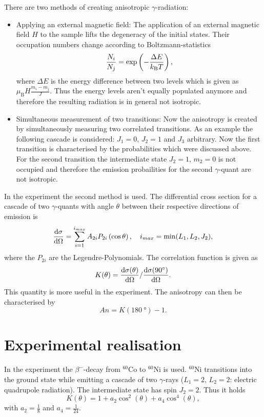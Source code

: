 There are two methods of creating anisotropic $\gamma$-radiation:
\begin{itemize}
 \item Applying an external magnetic field: The application of an external magnetic field $H$ to the sample lifts the degeneracy of the initial states. Their occupation numbers change according to Boltzmann-statistics
	\begin{equation}
	 \frac{N_{i}}{N_{j}} = \exp\left(-\frac{\Delta E}{k_{\textrm{B}} T}\right),
	\end{equation}
	where $\Delta E$ is the energy difference between two levels which is given as $\mu_{\textrm{B}}H\frac{m_{i}-m_{j}}{J}$. Thus the energy levels aren't equally populated anymore and therefore the resulting radiation is in general not isotropic.
 \item Simultaneous measurement of two transitions: Now the anisotropy is created by simultaneously measuring two correlated transitions. As an example the following cascade is considered: $J_{1}=0$, $J_{2}=1$ and $J_{3}$ arbitrary. Now the first transition is characterised by the probabilities which were discussed above. For the second transition the intermediate state $J_{2}=1, \, m_{2}=0$ is not occupied and therefore the emission probailities for the second $\gamma$-quant are not isotropic.  
\end{itemize}

In the experiment the second method is used. The differential cross section for a cascade of two $\gamma$-quants with angle $\theta$ between their respective directions of emission is \cite{BB}
\begin{equation}
 \frac{\text{d}\sigma}{\text{d}\Omega} = \sum_{i=1}^{i_{max}} A_{2i}P_{2i}\left(\cos\theta\right), \quad i_{max}= \textrm{min}(L_{1},L_{2},J_{2}),
\end{equation}
where the $P_{2i}$ are the Legendre-Polynomials. The correlation function is given as
\begin{equation}
 K(\theta) = \frac{\text{d}\sigma(\theta)}{\text{d}\Omega} / \frac{\text{d}\sigma(\SI{90}{\degree})}{\text{d}\Omega}.
\end{equation}
This quantity is more useful in the experiment. The anisotropy can then be characterised by
\begin{equation}
 An = K(\SI{180}{\degree})-1.
\end{equation}

\section{Experimental realisation}

In the experiment the $\beta^{-}$-decay from $^{60}$Co to $^{60}$Ni is used. $^{60}$Ni transitions into the ground state while emitting a cascade of two $\gamma$-rays ($L_{1}=2,\,L_{2}=2$: electric quadrupole radiation). The intermediate state has spin $J_{2}=2$. Thus it holds
\begin{equation}
 K(\theta) = 1 + a_{2}\cos^{2}(\theta) + a_{4}\cos^{4}(\theta),
\end{equation}
with $a_{2}=\frac{1}{8}$ and $a_{4}=\frac{1}{24}$. \cite{BB}


